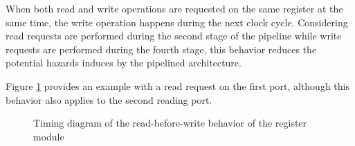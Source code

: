 \begin{content}
    When both read and write operations are requested on the same register at the same time, the write operation happens during the next clock cycle. Considering read requests are performed during the second stage of the pipeline while write requests are performed during the fourth stage, this behavior reduces the potential hazards induces by the pipelined architecture.

    Figure \ref{fig:regm-behavior-read-before-write} provides an example with a read request on the first port, although this behavior also applies to the second reading port.
\end{content}

\begin{figure}[H]
    \centering
    
    \caption{Timing diagram of the read-before-write behavior of the register module}
    \label{fig:regm-behavior-read-before-write}
\end{figure}

\newpage